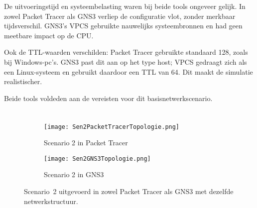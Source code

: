 \vspace{0.3cm}

De uitvoeringstijd en systeembelasting waren bij beide tools ongeveer gelijk. In zowel Packet Tracer als GNS3 verliep de configuratie vlot, zonder merkbaar tijdsverschil. GNS3’s VPCS gebruikte nauwelijks systeembronnen en had geen meetbare impact op de CPU.

\vspace{0.3cm}

Ook de TTL-waarden verschilden: Packet Tracer gebruikte standaard 128, zoals bij Windows-pc’s. GNS3 past dit aan op het type host; VPCS gedraagt zich als een Linux-systeem en gebruikt daardoor een TTL van 64. Dit maakt de simulatie realistischer. 

\vspace{0.3cm}

Beide tools voldeden aan de vereisten voor dit basisnetwerkscenario. 


\section{}

\label{sec:scenario2}



\subsection{}
\label{sec:topologie-scenario2}

\begin{figure}[H]
    \centering
    \begin{subfigure}[b]{0.48\textwidth}
        \texttt{[image: Sen2PacketTracerTopologie.png]}
        \caption{Scenario 2 in Packet Tracer}
        \label{fig:pt_scenario2}
    \end{subfigure}
    \hfill
    \begin{subfigure}[b]{0.48\textwidth}
        \texttt{[image: Sen2GNS3Topologie.png]}
        \caption{Scenario 2 in GNS3}
        \label{fig:gns3_scenario2}
    \end{subfigure}
    \caption[Scenario 2 in beide tools.]{\label{fig:scenario2}Scenario~2 uitgevoerd in zowel Packet Tracer als GNS3 met dezelfde netwerkstructuur.}
\end{figure}


